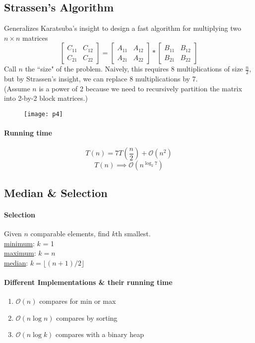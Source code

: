 \documentclass[11pt]{article}
\newcommand{\under}[1]{\underline{#1}}
\begin{document}
\subsection{Strassen's Algorithm}
Generalizes Karatsuba's insight to design a fast algorithm for multiplying two $n \times n$ matrices
$$ \begin{bmatrix} C_{11} & C_{12} \\
C_{21} & C_{22}
\end{bmatrix} 
= \begin{bmatrix} A_{11} & A_{12} \\
A_{21} & A_{22}
\end{bmatrix} * \begin{bmatrix} B_{11} & B_{12} \\
B_{21} & B_{22}
\end{bmatrix}$$
Call $n$ the ``size" of the problem. Naively, this requires 8 multiplications of size $\frac{n}{2}$, but by Strassen's insight, we can replace 8 multiplications by 7.\\
(Assume $n$ is a power of 2 because we need to recursively partition the matrix into 2-by-2 block matrices.)
\begin{figure}[h]
	\centering
	\texttt{[image: p4]}
\end{figure}

\paragraph{Running time}
$$T(n) = 7T(\frac{n}{2}) + \mathcal{O}(n^2)$$
$$T(n) \implies \mathcal{O}(n^{\log_2 7})$$


\subsection{Median \& Selection}
\paragraph{Selection}
Given $n$ comparable elements, find $k$th smallest. \\
\under{minimum}: $k$ = 1 \\
\under{maximum}: $k=n$ \\
\under{median}: $k = \lfloor (n+1) / 2\rfloor$

\paragraph{Different Implementations \& their running time}
\begin{enumerate}
	\item $\mathcal{O}(n)$ compares for min or max
	\item $\mathcal{O}(n \log n)$ compares by sorting
	\item $\mathcal{O}(n \log k)$ compares with a binary heap
\end{enumerate}
\end{document}
